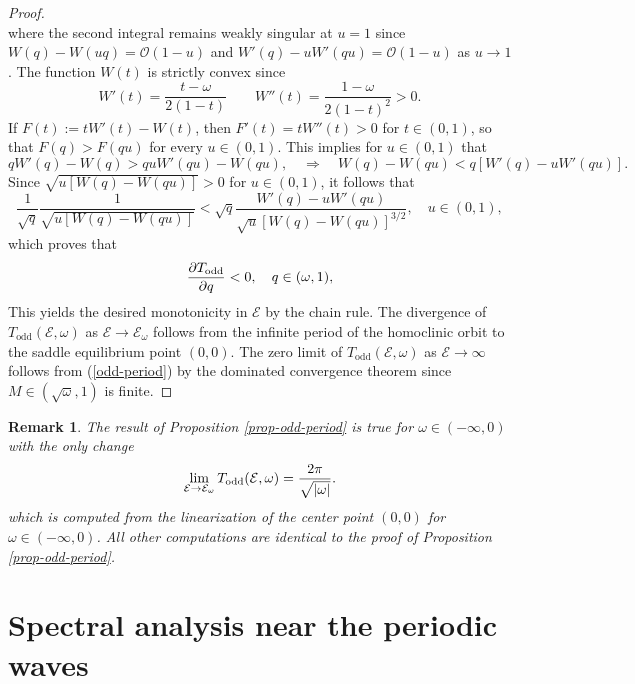 \documentclass[12pt,reqno]{amsart}
\numberwithin{equation}{section}
\numberwithin{figure}{section}
\newtheorem{remark}[theorem]{Remark}
\begin{document}
\begin{proof}
\begin{equation*}
		\end{equation*} 
where the second integral remains weakly singular at $u = 1$ since 
$W(q) - W(uq) = \mathcal{O}(1-u)$ and $W'(q) - uW'(qu) = \mathcal O(1-u)$ as $u\to 1$. The function $W(t)$ is strictly convex since
		\begin{equation*}
		W'(t) = \frac{t-\omega}{2(1-t)} \quad \quad W''(t) = \frac{1-\omega}{2(1-t)^2} > 0. 
		\end{equation*} 
If $F(t):=tW'(t)-W(t)$, then $F'(t) = tW''(t) > 0$ for $t \in (0,1)$, so that $F(q) > F(qu)$ for every $u\in (0,1)$. This implies for $u \in (0,1)$ that 
		\begin{equation*} 
qW'(q)-W(q) >  quW'(qu)-W(qu), \quad \Rightarrow \quad 
		W(q) - W(qu) < q [ W'(q) - u W'(qu)].
		\end{equation*} 
		Since $\sqrt{u [W(q) - W(qu)]} > 0$ for $u \in (0,1)$, it follows that 
		\begin{equation*}
		\frac{1}{\sqrt{q}} \frac{1}{\sqrt{u[W(q) - W(qu)]}} < \sqrt{q} \frac{W'(q) - uW'(qu)}{\sqrt{u}\left [W(q) - W(qu) \right ]^{3/2}}, \quad u \in (0,1),
		\end{equation*} 
which proves that 
$$
		\frac{\partial T_{\rm odd}}{\partial q} < 0, \quad q \in (\omega,1),
$$
This yields the desired monotonicity in $\mathcal{E}$ by the chain rule. 		The divergence of $T_\mathrm{odd}(\mathcal E,\omega)$ as $\mathcal{E} \to \mathcal{E}_{\omega}$ follows from the infinite period of the homoclinic orbit to the saddle equilibrium point $(0,0)$.
The zero limit of $T_\mathrm{odd}(\mathcal E,\omega)$ as $\mathcal{E} \to \infty$  follows from (\ref{odd-period}) by the dominated convergence theorem since $M \in (\sqrt{\omega},1)$ is finite.
	\end{proof}

\begin{remark}
	The result of Proposition \ref{prop-odd-period} is true for $\omega \in (-\infty,0)$ with the only change 
	$$
	\lim_{\mathcal{E} \to \mathcal{E}_{\omega}} T_{\rm odd}(\mathcal{E},\omega) = \frac{2\pi}{\sqrt{|\omega|}}. 
	$$
	which is computed from the linearization of the center point $(0,0)$ for $\omega \in (-\infty,0)$. All other computations are identical to the proof of Proposition \ref{prop-odd-period}. 
\end{remark}
			
\section{Spectral analysis near the periodic waves}
\label{sec-4}
		
\end{document}
